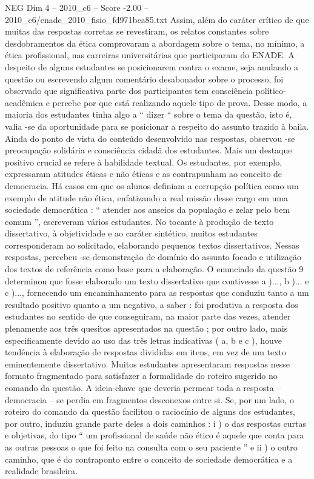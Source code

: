 \begin{textsample}{NEG Dim 4 – 2010\_c6 – Score -2.00 – 2010\_c6/enade\_2010\_fisio\_fd971bea85.txt}
Assim, além do caráter crítico de que muitas das respostas corretas se revestiram, os relatos constantes sobre desdobramentos da ética comprovaram a abordagem sobre o tema, no mínimo, a ética profissional, nas carreiras universitárias que participaram do ENADE.
A despeito de alguns estudantes se posicionarem contra o exame, seja anulando a questão ou escrevendo algum comentário desabonador sobre o processo, foi observado que significativa parte dos participantes tem consciência político-acadêmica e percebe por que está realizando aquele tipo de prova.
Desse modo, a maioria dos estudantes tinha algo a “ dizer “ sobre o tema da questão, isto é, valia -se da oportunidade para se posicionar a respeito do assunto trazido à baila.
Ainda do ponto de vista do conteúdo desenvolvido nas respostas, observou -se preocupação solidária e consciência cidadã dos estudantes.
Mais um destaque positivo crucial se refere à habilidade textual.
Os estudantes, por exemplo, expressaram atitudes éticas e não éticas e as contrapunham ao conceito de democracia.
Há casos em que os alunos definiam a corrupção política como um exemplo de atitude não ética, enfatizando a real missão desse cargo em uma sociedade democrática : “ atender aos anseios da população e zelar pelo bem comum ”, escreveram vários estudantes.
No tocante à produção de texto dissertativo, à objetividade e ao caráter sintético, muitos estudantes corresponderam ao solicitado, elaborando pequenos textos dissertativos.
Nessas respostas, percebeu -se demonstração de domínio do assunto focado e utilização dos textos de referência como base para a elaboração.
O enunciado da questão 9 determinou que fosse elaborado um texto dissertativo que contivesse a )..., b )... e c )..., fornecendo um encaminhamento para as respostas que conduziu tanto a um resultado positivo quanto a um negativo, a saber : foi produtiva a resposta dos estudantes no sentido de que conseguiram, na maior parte das vezes, atender plenamente aos três quesitos apresentados na questão ; por outro lado, mais especificamente devido ao uso das três letras indicativas ( a, b e c ), houve tendência à elaboração de respostas divididas em itens, em vez de um texto eminentemente dissertativo.
Muitos estudantes apresentaram respostas nesse formato fragmentado para satisfazer a formalidade do roteiro sugerido no comando da questão.
A ideia-chave que deveria permear toda a resposta – democracia – se perdia em fragmentos desconexos entre si.
Se, por um lado, o roteiro do comando da questão facilitou o raciocínio de alguns dos estudantes, por outro, induziu grande parte deles a dois caminhos : i ) o das respostas curtas e objetivas, do tipo “ um profissional de saúde não ético é aquele que conta para as outras pessoas o que foi feito na consulta com o seu paciente ” e ii ) o outro caminho, que é do contraponto entre o conceito de sociedade democrática e a realidade brasileira.

\end{textsample}
